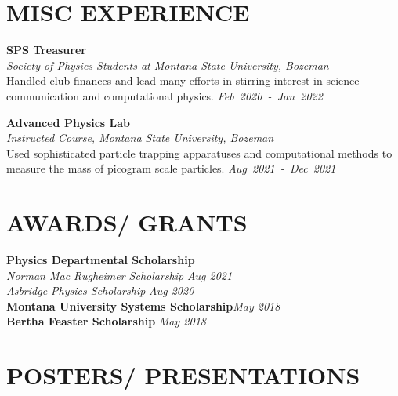 \documentclass[margin]{res}
\begin{document}
\begin{resume}
\section{MISC EXPERIENCE}
\noindent
\raggedright
\textbf{\textbf{SPS Treasurer}}\\
{\sl Society of Physics Students at Montana State University, Bozeman}\\\vspace{0.5ex}
Handled club finances and lead many efforts in stirring interest in science communication and computational physics.   \hfill
{\sl Feb~2020~-~Jan~2022}

\noindent
\raggedright
\textbf{Advanced Physics Lab}\\
{\sl Instructed Course, Montana State University, Bozeman}\\\vspace{0.5ex}
Used sophisticated particle trapping apparatuses and computational methods to measure the mass of picogram scale particles.  \hfill
{\sl Aug~2021~-~Dec~2021}

\section{AWARDS/ GRANTS}
\textbf{Physics Departmental Scholarship}\\
\hspace{3ex} {\sl Norman Mac Rugheimer Scholarship} \hfill {\sl Aug 2021}\\\vspace{0.5ex}
\hspace{3ex} {\sl Asbridge Physics Scholarship} \hfill {\sl Aug 2020}\\\vspace{0.5ex}
\textbf{Montana University Systems Scholarship}\hfill\hfil {\sl May 2018}\\\vspace{0.5ex}
\textbf{Bertha Feaster Scholarship} \hfill {\sl May 2018}

\section{POSTERS/ PRESENTATIONS}


\end{resume}
\end{document}
